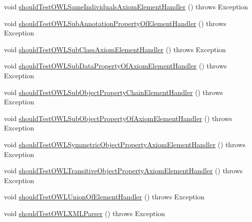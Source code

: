 \begin{DoxyCompactItemize}
\item 
void \hyperlink{classorg_1_1semanticweb_1_1owlapi_1_1contract_1_1_contract_owlxmlparser_test_afc5673ce978811509f798aa5042264ba}{should\-Test\-O\-W\-L\-Same\-Individuals\-Axiom\-Element\-Handler} ()  throws Exception 
\item 
void \hyperlink{classorg_1_1semanticweb_1_1owlapi_1_1contract_1_1_contract_owlxmlparser_test_a5dd31b8391f1553486fbd7dd9f35a43b}{should\-Test\-O\-W\-L\-Sub\-Annotation\-Property\-Of\-Element\-Handler} ()  throws Exception 
\item 
void \hyperlink{classorg_1_1semanticweb_1_1owlapi_1_1contract_1_1_contract_owlxmlparser_test_a9b0f99886dc9cc4c81938698ad106ad1}{should\-Test\-O\-W\-L\-Sub\-Class\-Axiom\-Element\-Handler} ()  throws Exception 
\item 
void \hyperlink{classorg_1_1semanticweb_1_1owlapi_1_1contract_1_1_contract_owlxmlparser_test_a16e200d988aa7bbb1e1c69251963bbbc}{should\-Test\-O\-W\-L\-Sub\-Data\-Property\-Of\-Axiom\-Element\-Handler} ()  throws Exception 
\item 
void \hyperlink{classorg_1_1semanticweb_1_1owlapi_1_1contract_1_1_contract_owlxmlparser_test_a4f505502515892f7991d9a792844935f}{should\-Test\-O\-W\-L\-Sub\-Object\-Property\-Chain\-Element\-Handler} ()  throws Exception 
\item 
void \hyperlink{classorg_1_1semanticweb_1_1owlapi_1_1contract_1_1_contract_owlxmlparser_test_ac73a682e198efa6fe8296efbe0e19015}{should\-Test\-O\-W\-L\-Sub\-Object\-Property\-Of\-Axiom\-Element\-Handler} ()  throws Exception 
\item 
void \hyperlink{classorg_1_1semanticweb_1_1owlapi_1_1contract_1_1_contract_owlxmlparser_test_a67b87b55fc7d7a06e1d1b0c70d83b622}{should\-Test\-O\-W\-L\-Symmetric\-Object\-Property\-Axiom\-Element\-Handler} ()  throws Exception 
\item 
void \hyperlink{classorg_1_1semanticweb_1_1owlapi_1_1contract_1_1_contract_owlxmlparser_test_a4c5648250235956e9a983e6a546ce8a0}{should\-Test\-O\-W\-L\-Transitive\-Object\-Property\-Axiom\-Element\-Handler} ()  throws Exception 
\item 
void \hyperlink{classorg_1_1semanticweb_1_1owlapi_1_1contract_1_1_contract_owlxmlparser_test_ad63a85a2a728c4f80cef31d081b70fa6}{should\-Test\-O\-W\-L\-Union\-Of\-Element\-Handler} ()  throws Exception 
\item 
void \hyperlink{classorg_1_1semanticweb_1_1owlapi_1_1contract_1_1_contract_owlxmlparser_test_aca0450ccdb4d924b935d41aaf69e0efd}{should\-Test\-O\-W\-L\-X\-M\-L\-Parser} ()  throws Exception 

\end{DoxyCompactItemize}
